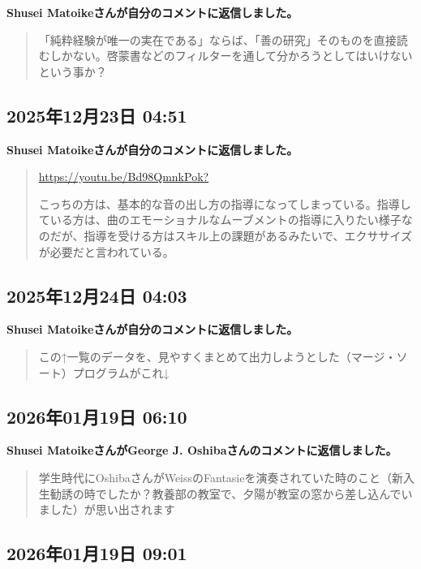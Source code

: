 \textbf{Shusei Matoikeさんが自分のコメントに返信しました。}

\begin{quote}
「純粋経験が唯一の実在である」ならば、「善の研究」そのものを直接読むしかない。啓蒙書などのフィルターを通して分かろうとしてはいけないという事か？
\end{quote}

\subsection*{2025年12月23日 04:51}

\textbf{Shusei Matoikeさんが自分のコメントに返信しました。}

\begin{quote}
\url{https://youtu.be/Bd98QmnkPok?}

こっちの方は、基本的な音の出し方の指導になってしまっている。指導している方は、曲のエモーショナルなムーブメントの指導に入りたい様子なのだが、指導を受ける方はスキル上の課題があるみたいで、エクササイズが必要だと言われている。
\end{quote}

\subsection*{2025年12月24日 04:03}

\textbf{Shusei Matoikeさんが自分のコメントに返信しました。}

\begin{quote}
この↑一覧のデータを、見やすくまとめて出力しようとした（マージ・ソート）プログラムがこれ↓
\end{quote}

\subsection*{2026年01月19日 06:10}

\textbf{Shusei MatoikeさんがGeorge J. Oshibaさんのコメントに返信しました。}

\begin{quote}
学生時代にOshibaさんがWeissのFantasieを演奏されていた時のこと（新入生勧誘の時でしたか？教養部の教室で、夕陽が教室の窓から差し込んでいました）が思い出されます
\end{quote}

\subsection*{2026年01月19日 09:01}

